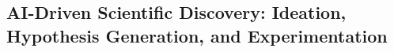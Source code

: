 
\subsection{AI-Driven Scientific Discovery: Ideation, Hypothesis Generation, and Experimentation}

\label{sec:experiments}


